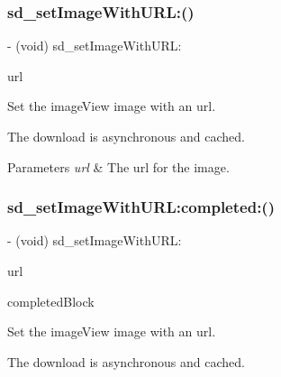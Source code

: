 \subsubsection{\texorpdfstring{sd\+\_\+set\+Image\+With\+U\+R\+L\+:()}{sd\_setImageWithURL:()}\hspace{0.1cm}{\footnotesize\ttfamily [3/3]}}
{\footnotesize\ttfamily -\/ (void) sd\+\_\+set\+Image\+With\+U\+R\+L\+: \begin{DoxyParamCaption}\item[{(N\+S\+U\+RL $\ast$)}]{url }\end{DoxyParamCaption}}

Set the image\+View {\ttfamily image} with an {\ttfamily url}.

The download is asynchronous and cached.


\begin{DoxyParams}{Parameters}
{\em url} & The url for the image. \\
\hline
\end{DoxyParams}
\mbox{\label{category_u_i_image_view_07_web_cache_08_a237803264855201b0f1150409fcbd74d}} 
\subsubsection{\texorpdfstring{sd\+\_\+set\+Image\+With\+U\+R\+L\+:completed\+:()}{sd\_setImageWithURL:completed:()}\hspace{0.1cm}{\footnotesize\ttfamily [1/3]}}
{\footnotesize\ttfamily -\/ (void) sd\+\_\+set\+Image\+With\+U\+R\+L\+: \begin{DoxyParamCaption}\item[{(N\+S\+U\+RL $\ast$)}]{url }\item[{completed:(S\+D\+Web\+Image\+Completion\+Block)}]{completed\+Block }\end{DoxyParamCaption}}

Set the image\+View {\ttfamily image} with an {\ttfamily url}.

The download is asynchronous and cached.


